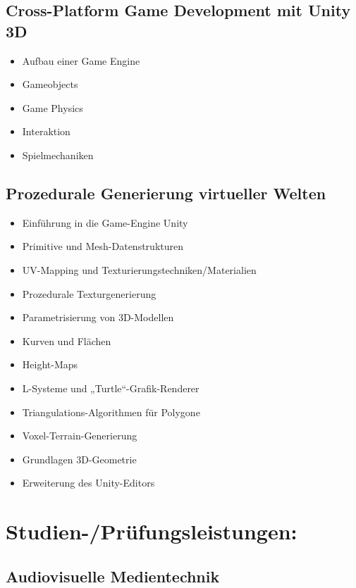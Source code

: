 \subsection*{Cross-Platform Game Development mit Unity
3D}\label{cross-platform-game-development-mit-unity-3d-1}

\begin{itemize}
\item
  Aufbau einer Game Engine
\item
  Gameobjects
\item
  Game Physics
\item
  Interaktion
\item
  Spielmechaniken
\end{itemize}

\subsection*{Prozedurale Generierung virtueller
Welten}\label{prozedurale-generierung-virtueller-welten-1}

\begin{itemize}
\item
  Einführung in die Game-Engine Unity
\item
  Primitive und Mesh-Datenstrukturen
\item
  UV-Mapping und Texturierungstechniken/Materialien
\item
  Prozedurale Texturgenerierung
\item
  Parametrisierung von 3D-Modellen
\item
  Kurven und Flächen
\item
  Height-Maps
\item
  L-Systeme und „Turtle``-Grafik-Renderer
\item
  Triangulations-Algorithmen für Polygone
\item
  Voxel-Terrain-Generierung
\item
  Grundlagen 3D-Geometrie
\item
  Erweiterung des Unity-Editors
\end{itemize}

\section*{Studien-/Prüfungsleistungen:}\label{studien-pruxfcfungsleistungen-24}

\subsection*{Audiovisuelle
Medientechnik}\label{audiovisuelle-medientechnik-2}

